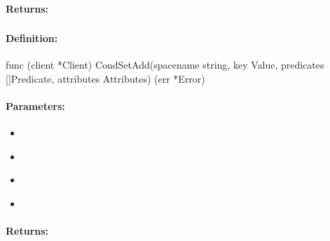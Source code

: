 \paragraph{Returns:}


\pagebreak
\subsubsection{}
\label{api:Go:CondSetAdd}


\paragraph{Definition:}
\begin{gocode}
func (client *Client) CondSetAdd(spacename string, key Value, predicates []Predicate, attributes Attributes) (err *Error)
\end{gocode}

\paragraph{Parameters:}
\begin{itemize}[noitemsep]
\item {}\\

\item {}\\

\item {}\\

\item {}\\

\end{itemize}

\paragraph{Returns:}


\pagebreak
\subsubsection{}
\label{api:Go:GroupSetAdd}



